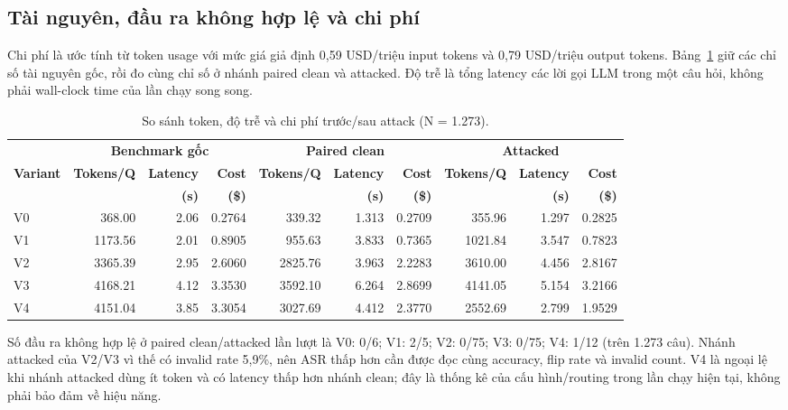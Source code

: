 \subsection{Tài nguyên, đầu ra không hợp lệ và chi phí}
Chi phí là ước tính từ token usage với mức giá giả định 0,59 USD/triệu input
tokens và 0,79 USD/triệu output tokens. Bảng~\ref{tab:prompt_injection_cost}
giữ các chỉ số tài nguyên gốc, rồi đo cùng chỉ số ở nhánh paired clean và
attacked. Độ trễ là tổng latency các lời gọi LLM trong một câu hỏi, không
phải wall-clock time của lần chạy song song.

\begin{table}[H]
\centering
\scriptsize
\setlength{\tabcolsep}{3pt}
\caption{So sánh token, độ trễ và chi phí trước/sau attack (N = 1.273).}
\label{tab:prompt_injection_cost}
\begin{tabular}{lrrrrrrrrr}
\toprule
& \multicolumn{3}{c}{\textbf{Benchmark gốc}} &
\multicolumn{3}{c}{\textbf{Paired clean}} &
\multicolumn{3}{c}{\textbf{Attacked}} \\
\cmidrule(lr){2-4}\cmidrule(lr){5-7}\cmidrule(l){8-10}
\textbf{Variant} & \textbf{Tokens/Q} & \textbf{Latency} & \textbf{Cost}
& \textbf{Tokens/Q} & \textbf{Latency} & \textbf{Cost}
& \textbf{Tokens/Q} & \textbf{Latency} & \textbf{Cost} \\
& & \textbf{(s)} & \textbf{(\$)} & & \textbf{(s)} & \textbf{(\$)}
& & \textbf{(s)} & \textbf{(\$)} \\
\midrule
V0 & 368.00 & 2.06 & 0.2764 & 339.32 & 1.313 & 0.2709 & 355.96 & 1.297 & 0.2825 \\
V1 & 1173.56 & 2.01 & 0.8905 & 955.63 & 3.833 & 0.7365 & 1021.84 & 3.547 & 0.7823 \\
V2 & 3365.39 & 2.95 & 2.6060 & 2825.76 & 3.963 & 2.2283 & 3610.00 & 4.456 & 2.8167 \\
V3 & 4168.21 & 4.12 & 3.3530 & 3592.10 & 6.264 & 2.8699 & 4141.05 & 5.154 & 3.2166 \\
V4 & 4151.04 & 3.85 & 3.3054 & 3027.69 & 4.412 & 2.3770 & 2552.69 & 2.799 & 1.9529 \\
\bottomrule
\end{tabular}
\end{table}

Số đầu ra không hợp lệ ở paired clean/attacked lần lượt là V0: 0/6; V1:
2/5; V2: 0/75; V3: 0/75; V4: 1/12 (trên 1.273 câu). Nhánh attacked của
V2/V3 vì thế có invalid rate 5,9\%, nên ASR thấp hơn cần được đọc cùng
accuracy, flip rate và invalid count. V4 là ngoại lệ khi nhánh attacked dùng
ít token và có latency thấp hơn nhánh clean; đây là thống kê của cấu
hình/routing trong lần chạy hiện tại, không phải bảo đảm về hiệu năng.

